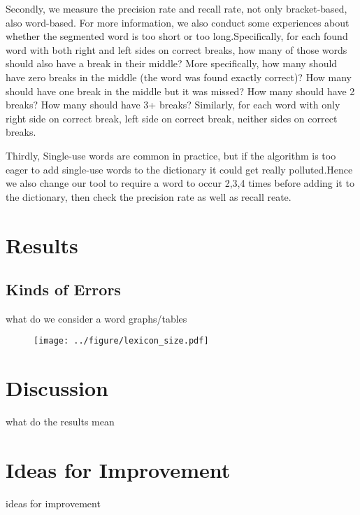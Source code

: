 \documentclass[11pt, oneside, fleqn]{article}
\begin{document}
    Secondly, we measure the precision rate and recall rate, not only bracket-based, also word-based. 
    For more information, we also conduct some experiences about whether the segmented word is too short or too long.Specifically, for each found word with both right and left sides on correct breaks, how many of those words should also have a break in their middle? More specifically, how many should have zero breaks in the middle (the word was found exactly correct)? How many should have one break in the middle but it was missed? How many should have 2 breaks? How many should have 3+ breaks? Similarly, for each word with only right side on correct break, left side on correct break, neither sides on correct breaks. 
   
    Thirdly, Single-use words are common in practice, but if the algorithm is too eager to add single-use words to the dictionary it could get really polluted.Hence we also change our tool to require a word to occur 2,3,4 times before adding it to the dictionary, then check the precision rate as well as recall reate. 
 
   \section*{Results}
   
   \subsection*{Kinds of Errors}

  what do we consider a word
  graphs/tables
 
  \begin{figure}[h]
  \texttt{[image: ../figure/lexicon\_size.pdf]}
  \end{figure}

  \section*{Discussion}

  what do the results mean

  \section*{Ideas for Improvement}

  ideas for improvement
\end{document}
